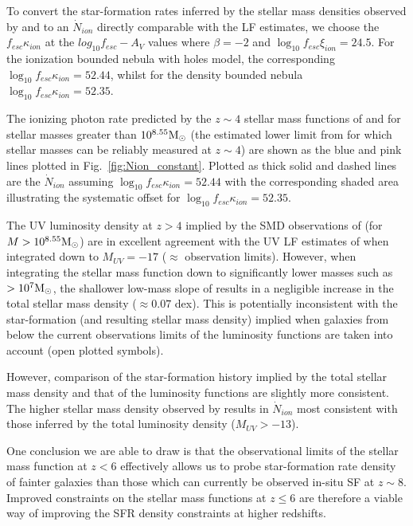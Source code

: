 To convert the star-formation rates inferred by the stellar mass densities observed by \citet{Duncan:2014gh} and \citet{Grazian:2014vx} to an $\dot{N}_{ion}$ directly comparable with the LF estimates, we choose the $f_{esc}\kappa_{ion}$ at the $log_{10}f_{esc}-A_{V}$ values where $\beta = -2$ and $\log_{10} f_{esc}\xi_{ion} = 24.5$. For the ionization bounded nebula with holes model, the corresponding $\log_{10} f_{esc}\kappa_{ion} =  52.44$, whilst for the density bounded nebula $\log_{10} f_{esc}\kappa_{ion} = 52.35$.

The ionizing photon rate predicted by the $z\sim4$ stellar mass functions of \citet{Duncan:2014gh} and \citet{Grazian:2014vx} for stellar masses greater than $10^{8.55}\/\rm{M}_{\odot}$ (the estimated lower limit from \citep{Duncan:2014gh} for which stellar masses can be reliably measured at $z\sim4$) are shown as the blue and pink lines plotted in Fig.~\ref{fig:Nion_constant}. Plotted as thick solid and dashed lines are the $\dot{N}_{ion}$ assuming $\log_{10} f_{esc}\kappa_{ion} = 52.44$ with the corresponding shaded area illustrating the systematic offset for $\log_{10} f_{esc}\kappa_{ion} = 52.35$. 

The UV luminosity density at $z > 4$ implied by the SMD observations of \citet{Grazian:2014vx} (for $M>10^{8.55}\/\rm{M}_{\odot}$) are in excellent agreement with the UV LF estimates of \citet{Bouwens:2014tx} when integrated down to $M_{UV} = -17$ ($\approx$ observation limits). However, when integrating the stellar mass function down to significantly lower masses such as $> 10^{7} \rm{M}_{\odot}$, the shallower low-mass slope of \citep{Grazian:2014vx} results in a negligible increase in the total stellar mass density ($\approx 0.07$ dex). This is potentially inconsistent with the star-formation (and resulting stellar mass density) implied when galaxies from below the current observations limits of the luminosity functions are taken into account (open plotted symbols). 

However, comparison of the star-formation history implied by the \citet{Grazian:2014vx} total stellar mass density and that of the \citet{Finkelstein:2014ub} luminosity functions are slightly more consistent. The higher stellar mass density observed by \citet{Duncan:2014gh} results in $\dot{N}_{ion}$ most consistent with those inferred by the \citet{Bouwens:2014tx} total luminosity density ($M_{UV} > -13$). 

One conclusion we are able to draw is that the observational limits of the stellar mass function at $z < 6$ effectively allows us to probe star-formation rate density of fainter galaxies than those which can currently be observed in-situ SF at $z\sim8$. Improved constraints on the stellar mass functions at $z \leq 6$ are therefore a viable way of improving the SFR density constraints at higher redshifts. 

